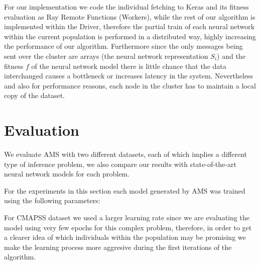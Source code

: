 \documentclass[journal]{IEEEtran}
\begin{document}
For our implementation we code the individual fetching to Keras and its fitness evaluation as Ray Remote Functions (Workers), while the rest of our algorithm is implemented within the Driver, therefore the partial train of each neural network within the current population is performed in a distributed way, highly increasing the performance of our algorithm. Furthermore since the only messages being sent over the cluster are arrays (the neural network representation $S_i$) and the fitness $f$ of the neural network model there is little chance that the data interchanged causes a bottleneck or increases latency in the system. Nevertheless and also for performance reasons, each node in the cluster has to maintain a local copy of the dataset.

\section{Evaluation}
\label{sec:evaluation}

We evaluate AMS with two different datasets, each of which implies a different type of inference problem, we also compare our results with state-of-the-art neural network models for each problem.

For the experiments in this section each model generated by AMS was trained using the following parameters:

\begin{table}[!htb]
\begin{center}
\end{center}
\caption{Training parameters for each of the used datasets.}
\label{table:training_params}
\end{table}

For CMAPSS dataset we used a larger learning rate since we are evaluating the model using very few epochs for this complex problem, therefore, in order to get a clearer idea of which individuals within the population may be promising we make the learning process more aggresive during the first iterations of the algorithm.
\end{document}
